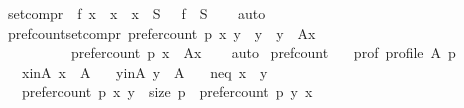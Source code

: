 \begin{isabellebody}
\isanewline
{}\isamarkupfalse%
\ set{\isacharunderscore}{\kern0pt}compr{\isacharcolon}{\kern0pt}\ {\isachardoublequoteopen}{\isacharbraceleft}{\kern0pt}\ f\ x\ {\isacharbar}{\kern0pt}\ x\ {\isachardot}{\kern0pt}\ x\ {\isasymin}\ S\ {\isacharbraceright}{\kern0pt}\ {\isacharequal}{\kern0pt}\ f\ {\isacharbackquote}{\kern0pt}\ S{\isachardoublequoteclose}\isanewline
%
\isadelimproof
\ \ %
\endisadelimproof
%
\isatagproof
{}\isamarkupfalse%
\ auto%
\endisatagproof
{\isafoldproof}%
%
\isadelimproof
\isanewline
%
\endisadelimproof
\isanewline
{}\isamarkupfalse%
\ pref{\isacharunderscore}{\kern0pt}count{\isacharunderscore}{\kern0pt}set{\isacharunderscore}{\kern0pt}compr{\isacharcolon}{\kern0pt}\ {\isachardoublequoteopen}{\isacharbraceleft}{\kern0pt}prefer{\isacharunderscore}{\kern0pt}count\ p\ x\ y\ {\isacharbar}{\kern0pt}\ y\ {\isachardot}{\kern0pt}\ y\ {\isasymin}\ A{\isacharminus}{\kern0pt}{\isacharbraceleft}{\kern0pt}x{\isacharbraceright}{\kern0pt}{\isacharbraceright}{\kern0pt}\ {\isacharequal}{\kern0pt}\isanewline
\ \ \ \ \ \ \ \ \ \ {\isacharparenleft}{\kern0pt}prefer{\isacharunderscore}{\kern0pt}count\ p\ x{\isacharparenright}{\kern0pt}\ {\isacharbackquote}{\kern0pt}\ {\isacharparenleft}{\kern0pt}A{\isacharminus}{\kern0pt}{\isacharbraceleft}{\kern0pt}x{\isacharbraceright}{\kern0pt}{\isacharparenright}{\kern0pt}{\isachardoublequoteclose}\isanewline
%
\isadelimproof
\ \ %
\endisadelimproof
%
\isatagproof
{}\isamarkupfalse%
\ auto%
\endisatagproof
{\isafoldproof}%
%
\isadelimproof
\isanewline
%
\endisadelimproof
\isanewline
{}\isamarkupfalse%
\ pref{\isacharunderscore}{\kern0pt}count{\isacharcolon}{\kern0pt}\isanewline
\ \ \ prof{\isacharcolon}{\kern0pt}\ {\isachardoublequoteopen}profile\ A\ p{\isachardoublequoteclose}\isanewline
\ \ \ x{\isacharunderscore}{\kern0pt}in{\isacharunderscore}{\kern0pt}A{\isacharcolon}{\kern0pt}\ {\isachardoublequoteopen}x\ {\isasymin}\ A{\isachardoublequoteclose}\isanewline
\ \ \ y{\isacharunderscore}{\kern0pt}in{\isacharunderscore}{\kern0pt}A{\isacharcolon}{\kern0pt}\ {\isachardoublequoteopen}y\ {\isasymin}\ A{\isachardoublequoteclose}\isanewline
\ \ \ neq{\isacharcolon}{\kern0pt}\ {\isachardoublequoteopen}x\ {\isasymnoteq}\ y{\isachardoublequoteclose}\isanewline
\ \ \ {\isachardoublequoteopen}prefer{\isacharunderscore}{\kern0pt}count\ p\ x\ y\ {\isacharequal}{\kern0pt}\ {\isacharparenleft}{\kern0pt}size\ p{\isacharparenright}{\kern0pt}\ {\isacharminus}{\kern0pt}\ {\isacharparenleft}{\kern0pt}prefer{\isacharunderscore}{\kern0pt}count\ p\ y\ x{\isacharparenright}{\kern0pt}{\isachardoublequoteclose}\isanewline

\end{isabellebody}
